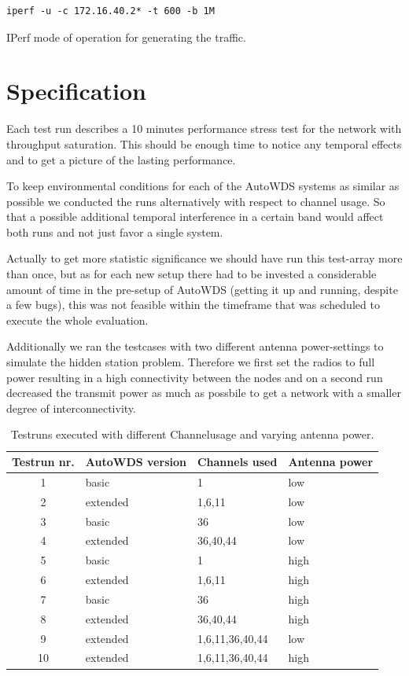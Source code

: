       \begin{listing}[h!]
	\begin{lstlisting}
iperf -u -c 172.16.40.2* -t 600 -b 1M
	\end{lstlisting}
	\caption{IPerf mode of operation for generating the traffic.}
	\label{lst:iperf}
      \end{listing}
    
  \section{Specification}
    Each test run describes a 10 minutes performance stress test for the network with throughput saturation. 
    This should be enough time to notice any temporal effects and to get a picture of the lasting performance.
    
    To keep environmental conditions for each of the AutoWDS systems as similar as possible we conducted the runs alternatively with respect to channel usage.
    So that a possible additional temporal interference in a certain band would affect both runs and not just favor a single system.
  
    Actually to get more statistic significance we should have run this test-array more than once, but as for each new setup there had to 
    be invested a considerable amount of time in the pre-setup of AutoWDS (getting it up and running, despite a few bugs), this was not feasible within
    the timeframe that was scheduled to execute the whole evaluation.
    
    Additionally we ran the testcases with two different antenna power-settings to simulate the hidden station problem. Therefore we first set the radios to full power 
    resulting in a high connectivity between the nodes and on a second run decreased the transmit power as much as possbile to get a network with a smaller degree
    of interconnectivity.
  
    \begin{table}[h!]
      \centering
      \begin{tabular}{clll}
	Testrun nr. & AutoWDS version & Channels used & Antenna power\\ \hline
	1 & basic & 1 & low \\
	2 & extended & 1,6,11 & low \\
	3 & basic & 36 & low \\
	4 & extended & 36,40,44 & low \\
	5 & basic & 1 & high \\
	6 & extended & 1,6,11 & high \\
	7 & basic & 36 & high \\
	8 & extended & 36,40,44 & high \\
	9 & extended & 1,6,11,36,40,44 & low \\
	10 & extended & 1,6,11,36,40,44 & high \\
      \end{tabular}
      \caption{Testruns executed with different Channelusage and varying antenna power.}
      \label{tab:testruns}
    \end{table}
    
